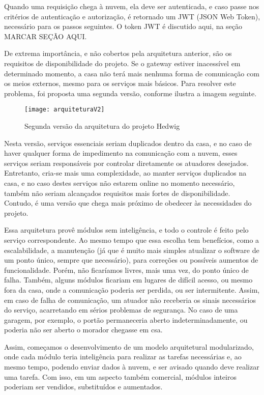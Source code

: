 Quando uma requisição chega à nuvem, ela deve ser autenticada, e caso passe nos critérios de autenticação e autorização, é retornado um JWT (JSON Web Token), necessário para os passos seguintes. O token JWT é discutido aqui, na seção MARCAR SEÇÃO AQUI.

De extrema importância, e não cobertos pela arquitetura anterior, são os requisitos de disponibilidade do projeto. Se o gateway estiver inacessível em determinado momento, a casa não terá mais nenhuma forma de comunicação com os meios externos, mesmo para os serviços mais básicos. Para resolver este problema, foi proposta uma segunda versão, conforme ilustra a imagem seguinte.

\begin{figure}[H]
	\centering
	\caption{Segunda versão da arquitetura do projeto Hedwig}
  \texttt{[image: arquiteturaV2]}
\label{fig:arquiteturaV2}
\end{figure}

Nesta versão, serviços essenciais seriam duplicados dentro da casa, e no caso de haver qualquer forma de impedimento na comunicação com a nuvem, esses serviços seriam responsáveis por controlar diretamente os atuadores desejados. Entretanto, cria-se mais uma complexidade, ao manter serviços duplicados na casa, e no caso destes serviços não estarem online no momento necessário, também não seriam alcançados requisitos mais fortes de disponibilidade. Contudo, é uma versão que chega mais próximo de obedecer às necessidades do projeto.

Essa arquitetura provê módulos sem inteligência, e todo o controle é feito pelo serviço correspondente. Ao mesmo tempo que essa escolha tem benefícios, como a escalabilidade, a manutenção (já que é muito mais simples atualizar o software de um ponto único, sempre que necessário), para correções ou possíveis aumentos de funcionalidade. Porém, não ficaríamos livres, mais uma vez, do ponto único de falha. Também, alguns módulos ficariam em lugares de difícil acesso, ou mesmo fora da casa, onde a comunicação poderia ser perdida, ou ser intermitente. Assim, em caso de falha de comunicação, um atuador não receberia os sinais necessários do serviço, acarretando em sérios problemas de segurança. No caso de uma garagem, por exemplo, o portão permaneceria aberto indeterminadamente, ou poderia não ser aberto o morador chegasse em csa.

Assim, começamos o desenvolvimento de um modelo arquitetural modularizado, onde cada módulo teria inteligência para realizar as tarefas necessárias e, ao mesmo tempo, podendo enviar dados à nuvem, e ser avisado quando deve realizar uma tarefa. Com isso, em um aspecto também comercial, módulos inteiros poderiam ser vendidos, substituídos e aumentados.

